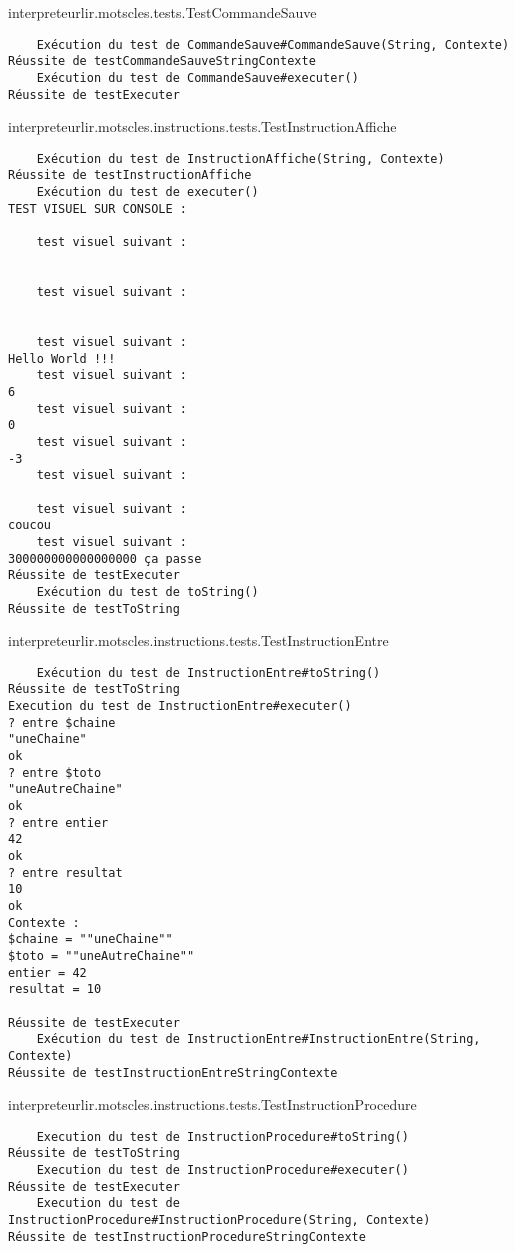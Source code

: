 \begin{enum}
    \item interpreteurlir.motscles.tests.TestCommandeSauve
\begin{verbatim}
    Exécution du test de CommandeSauve#CommandeSauve(String, Contexte)
Réussite de testCommandeSauveStringContexte
    Exécution du test de CommandeSauve#executer()
Réussite de testExecuter
\end{verbatim}

    \item interpreteurlir.motscles.instructions.tests.TestInstructionAffiche
\begin{verbatim}
    Exécution du test de InstructionAffiche(String, Contexte)
Réussite de testInstructionAffiche
    Exécution du test de executer()
TEST VISUEL SUR CONSOLE :

    test visuel suivant : 


    test visuel suivant : 


    test visuel suivant : 
Hello World !!!
    test visuel suivant : 
6
    test visuel suivant : 
0
    test visuel suivant : 
-3
    test visuel suivant : 

    test visuel suivant : 
coucou
    test visuel suivant : 
300000000000000000 ça passe
Réussite de testExecuter
    Exécution du test de toString()
Réussite de testToString
\end{verbatim}

    \item interpreteurlir.motscles.instructions.tests.TestInstructionEntre
\begin{verbatim}
    Exécution du test de InstructionEntre#toString()
Réussite de testToString
Execution du test de InstructionEntre#executer()
? entre $chaine
"uneChaine"
ok
? entre $toto
"uneAutreChaine"
ok
? entre entier
42
ok
? entre resultat
10
ok
Contexte : 
$chaine = ""uneChaine""
$toto = ""uneAutreChaine""
entier = 42
resultat = 10

Réussite de testExecuter
    Exécution du test de InstructionEntre#InstructionEntre(String, Contexte)
Réussite de testInstructionEntreStringContexte
\end{verbatim}


    \item interpreteurlir.motscles.instructions.tests.TestInstructionProcedure
\begin{verbatim}
    Execution du test de InstructionProcedure#toString()
Réussite de testToString
    Execution du test de InstructionProcedure#executer()
Réussite de testExecuter
    Execution du test de InstructionProcedure#InstructionProcedure(String, Contexte)
Réussite de testInstructionProcedureStringContexte
\end{verbatim}


\end{enum}
